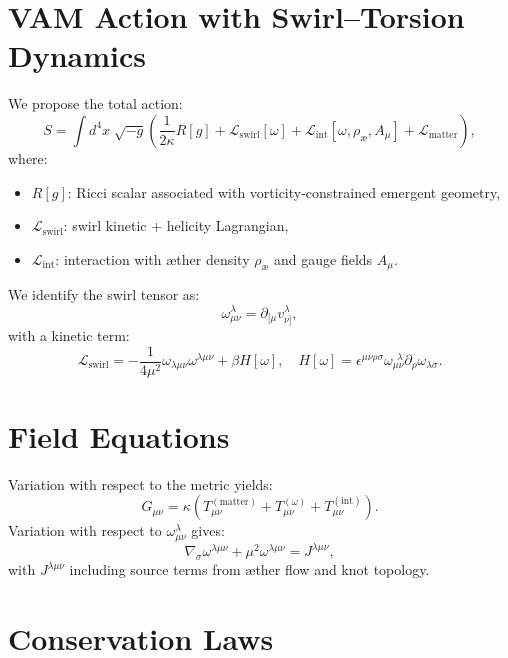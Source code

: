 \documentclass[12pt]{article}
\begin{document}
        \section{VAM Action with Swirl–Torsion Dynamics}

        We propose the total action:
        \[
            S = \int d^4x \; \sqrt{-g} \left( \frac{1}{2\kappa} R[g] + \mathcal{L}_\text{swirl}[\omega] + \mathcal{L}_\text{int}[\omega, \rho_{\text{\ae}}, A_\mu] + \mathcal{L}_\text{matter} \right),
        \]
        where:
        \begin{itemize}
            \item \( R[g] \): Ricci scalar associated with vorticity-constrained emergent geometry,
            \item \( \mathcal{L}_\text{swirl} \): swirl kinetic + helicity Lagrangian,
            \item \( \mathcal{L}_\text{int} \): interaction with æther density \( \rho_{\text{\ae}} \) and gauge fields \( A_\mu \).
        \end{itemize}

        We identify the swirl tensor as:
        \[
            \omega^\lambda_{\mu\nu} = \partial_{[\mu} v^\lambda_{\nu]},
        \]
        with a kinetic term:
        \[
            \mathcal{L}_\text{swirl} = -\frac{1}{4\mu^2} \omega_{\lambda\mu\nu} \omega^{\lambda\mu\nu} + \beta H[\omega], \quad H[\omega] = \epsilon^{\mu\nu\rho\sigma} \omega_{\mu\nu}^{\ \ \lambda} \partial_\rho \omega_{\lambda\sigma}.
        \]

        \section{Field Equations}

        Variation with respect to the metric yields:
        \[
            G_{\mu\nu} = \kappa \left( T_{\mu\nu}^{(\text{matter})} + T_{\mu\nu}^{(\omega)} + T_{\mu\nu}^{(\text{int})} \right).
        \]
        Variation with respect to \( \omega^\lambda_{\mu\nu} \) gives:
        \[
            \nabla_\sigma \omega^{\lambda\mu\nu} + \mu^2 \omega^{\lambda\mu\nu} = J^{\lambda\mu\nu},
        \]
        with \( J^{\lambda\mu\nu} \) including source terms from æther flow and knot topology.

        \section{Conservation Laws}
\end{document}
